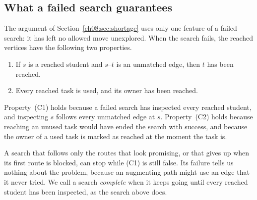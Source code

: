 \subsection*{What a failed search guarantees}
The argument of Section~\ref{ch08:sec:shortage} uses only one feature of a failed search: it has left no allowed move unexplored. When the search fails, the reached vertices have the following two properties.
\begin{enumerate}
\item[(C1)] If $s$ is a reached student and $s$--$t$ is an unmatched edge, then $t$ has been reached.
\item[(C2)] Every reached task is used, and its owner has been reached.
\end{enumerate}
Property~(C1) holds because a failed search has inspected every reached student, and inspecting $s$ follows every unmatched edge at $s$. Property~(C2) holds because reaching an unused task would have ended the search with success, and because the owner of a used task is marked as reached at the moment the task is.

A search that follows only the routes that look promising, or that gives up when its first route is blocked, can stop while (C1) is still false. Its failure tells us nothing about the problem, because an augmenting path might use an edge that it never tried. We call a search \emph{complete} when it keeps going until every reached student has been inspected, as the search above does.
